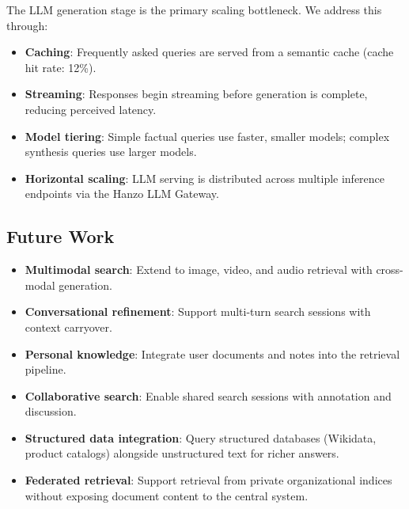 The LLM generation stage is the primary scaling bottleneck. We address this through:
\begin{itemize}[leftmargin=1.1em]
    \item \textbf{Caching}: Frequently asked queries are served from a semantic cache (cache hit rate: 12\%).
    \item \textbf{Streaming}: Responses begin streaming before generation is complete, reducing perceived latency.
    \item \textbf{Model tiering}: Simple factual queries use faster, smaller models; complex synthesis queries use larger models.
    \item \textbf{Horizontal scaling}: LLM serving is distributed across multiple inference endpoints via the Hanzo LLM Gateway.
\end{itemize}

\subsection{Future Work}

\begin{itemize}[leftmargin=1.1em]
    \item \textbf{Multimodal search}: Extend to image, video, and audio retrieval with cross-modal generation.
    \item \textbf{Conversational refinement}: Support multi-turn search sessions with context carryover.
    \item \textbf{Personal knowledge}: Integrate user documents and notes into the retrieval pipeline.
    \item \textbf{Collaborative search}: Enable shared search sessions with annotation and discussion.
    \item \textbf{Structured data integration}: Query structured databases (Wikidata, product catalogs) alongside unstructured text for richer answers.
    \item \textbf{Federated retrieval}: Support retrieval from private organizational indices without exposing document content to the central system.
\end{itemize}

